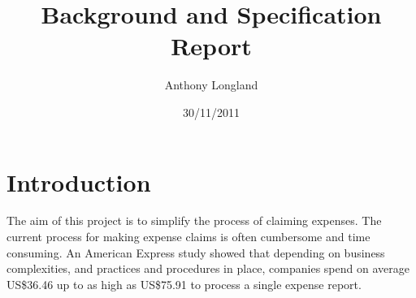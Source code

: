 \documentclass[a4paper]{article}
\begin{document}
\title{Background and Specification Report}
\author{Anthony Longland}
\date{30/11/2011} %
\maketitle

\tableofcontents

\section{Introduction}
The aim of this project is to simplify the process of claiming expenses. The current process for making expense claims is often cumbersome and time consuming. 
An American Express study showed that depending on business complexities, and practices and procedures in place, companies spend on average US\$36.46 up to as high as US\$75.91 to process a single expense report.\cite{Expense2010}

\subsection{}



\newpage{}
\begin{thebibliography}{9}


\end{thebibliography}
\end{document}

